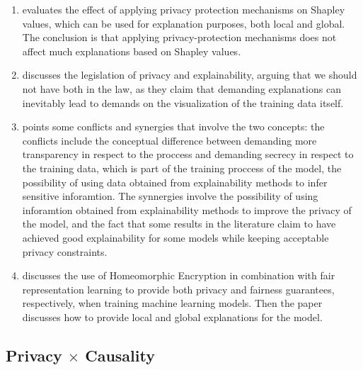 \begin{enumerate}
\item \cite{Privacy and Explainability: The Effects of Data Protection on Shapley Values} evaluates the effect of applying privacy protection mechanisms on Shapley values, which can be used for explanation purposes, both local and global. The conclusion is that applying privacy-protection mechanisms does not affect much explanations based on Shapley values.
\item \cite{Show us the data: Privacy, explainability, and why the law can't have both} discusses the legislation of privacy and explainability, arguing that we should not have both in the law, as they claim that demanding explanations can inevitably lead to demands on the visualization of the training data itself.
\item \cite{SoK: Taming the Triangle--On the Interplays between Fairness, Interpretability and Privacy in Machine Learning} points some conflicts and synergies that involve the two concepts: the conflicts include the conceptual difference between demanding more transparency in respect to the proccess and demanding secrecy in respect to the training data, which is part of the training proccess of the model, the possibility of using data obtained from explainability methods to infer sensitive inforamtion. The synnergies involve the possibility of using inforamtion obtained from explainability methods to improve the privacy of the model, and the fact that some results in the literature claim to have achieved good explainability for some models while keeping acceptable privacy constraints.
\item \cite{Toward Learning Trustworthily from Data Combining Privacy, Fairness, and Explainability: An Application to Face Recognition} discusses the use of Homeomorphic Encryption in combination with fair representation learning \cite{Learning fair representations} to provide both privacy and fairness guarantees, respectively, when training machine learning models. Then the paper discusses how to provide local and global explanations for the model.
\end{enumerate}


\subsection{Privacy $\times$ Causality}

